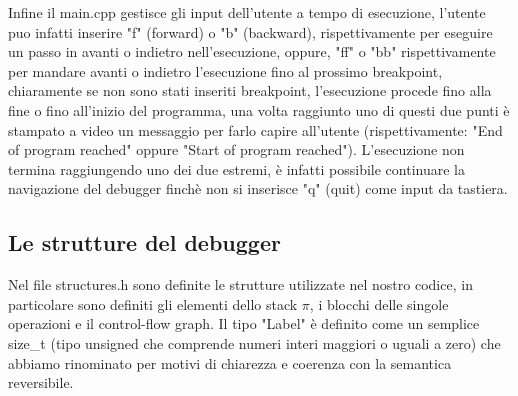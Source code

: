 \documentclass{article}
\theoremstyle{plain}
\theoremstyle{definition}
\theoremstyle{plain}
\begin{document}
Infine il main.cpp gestisce gli input dell'utente a tempo di esecuzione, l'utente puo infatti inserire "f" (forward) o "b" (backward), rispettivamente per eseguire un passo in avanti o indietro nell'esecuzione, oppure, "ff" o "bb" rispettivamente per mandare avanti o indietro l'esecuzione fino al prossimo breakpoint, chiaramente se non sono stati inseriti breakpoint, l'esecuzione procede fino alla fine o fino all'inizio del programma, una volta raggiunto uno di questi due punti è stampato a video un messaggio per farlo capire all'utente (rispettivamente: "End of program reached" oppure "Start of program reached"). L'esecuzione non termina raggiungendo uno dei due estremi, è infatti possibile continuare la navigazione del debugger finchè non si inserisce "q" (quit) come input da tastiera.


\subsection{Le strutture del debugger}
Nel file structures.h sono definite le strutture utilizzate nel nostro codice, in particolare sono definiti gli elementi dello stack $\pi$, i blocchi delle singole operazioni e il control-flow graph. Il tipo "Label" è definito come un semplice size\_t (tipo unsigned che comprende numeri interi maggiori o uguali a zero) che abbiamo rinominato per motivi di chiarezza e coerenza con la semantica reversibile.
\end{document}
